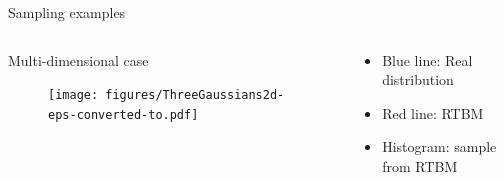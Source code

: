 \documentclass[10pt]{beamer}
\begin{document}
\begin{frame}{Sampling examples}
\begin{figure}[t!]
\begin{center}
        \end{center}
      \end{figure}
      \vspace{-0.5cm}
      \begin{columns}
        \begin{column}{0.6 \textwidth}
            \begin{center}
                Multi-dimensional case
            \end{center}
            \vspace{-0.5cm}
            \begin{figure}[t!]
                \begin{center}
                \texttt{[image: figures/ThreeGaussians2d-eps-converted-to.pdf]}
        
        
                \end{center}
              \end{figure}
        \end{column}
        \begin{column}{0.4 \textwidth}
            \begin{itemize}
                \item Blue line: Real distribution
                \item Red line: RTBM
                \item Histogram: sample from RTBM
            \end{itemize}
        \end{column}
      \end{columns}
     
\end{frame}
\end{document}
